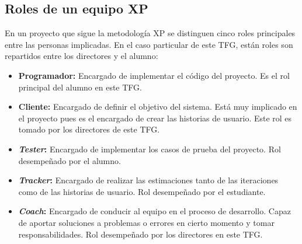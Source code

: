 \subsection{Roles de un equipo XP}
En un proyecto que sigue la metodología \gls{XP} se distinguen cinco roles principales entre las personas implicadas. En el caso particular de este \gls{TFG}, están roles son repartidos entre los directores y el alumno:
\begin{itemize}
\item \textbf{Programador:} Encargado de implementar el código del proyecto. Es el rol principal del alumno en este \gls{TFG}.
\item \textbf{Cliente:} Encargado de definir el objetivo del sistema. Está muy implicado en el proyecto pues es el encargado de crear las historias de usuario. Este rol es tomado por los directores de este \gls{TFG}.
\item \textbf{\textit{Tester}:} Encargado de implementar los casos de prueba del proyecto. Rol desempeñado por el alumno.
\item \textbf{\textit{Tracker}:} Encargado de realizar las estimaciones tanto de las iteraciones como de las historias de usuario. Rol desempeñado por el estudiante.
  \item \textbf{\textit{Coach}:} Encargado de conducir al equipo en el proceso de desarrollo. Capaz de aportar soluciones a problemas o errores en cierto momento y tomar responsabilidades. Rol desempeñado por los directores en este \gls{TFG}.

\end{itemize}
